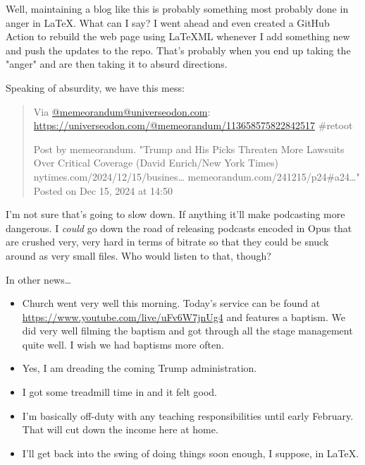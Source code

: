 Well, maintaining a blog like this is probably something most probably done in anger in \LaTeX.  What can I say?  I went ahead and even created a GitHub Action to rebuild the web page using LaTeXML whenever I add something new and push the updates to the repo.  That's probably when you end up taking the "anger" and are then taking it to absurd directions.

Speaking of absurdity, we have this mess:

\begin{quote}
    Via \href{https://universeodon.com/@memorandum}{@memeorandum@universeodon.com}: \url{https://universeodon.com/@memeorandum/113658575822842517} \#retoot

    Post by memeorandum. "Trump and His Picks Threaten More Lawsuits Over Critical Coverage (David Enrich/New York Times) nytimes.com/2024/12/15/busines… memeorandum.com/241215/p24\#a24…" Posted on Dec 15, 2024 at 14:50

\end{quote}

I'm not sure that's going to slow down.  If anything it'll make podcasting more dangerous.  I \emph{could} go down the road of releasing podcasts encoded in Opus that are crushed very, very hard in terms of bitrate so that they could be snuck around as very small files.  Who would listen to that, though?

In other news\ldots 

\begin{itemize}
\item Church went very well this morning.  Today's service can be found at \url{https://www.youtube.com/live/uFv6W7jnUg4} and features a baptism.  We did very well filming the baptism and got through all the stage management quite well.  I wish we had baptisms more often.
\item Yes, I am dreading the coming Trump administration.
\item I got some treadmill time in and it felt good.
\item I'm basically off-duty with any teaching responsibilities until early February.  That will cut down the income here at home.
\item I'll get back into the swing of doing things soon enough, I suppose, in \LaTeX. 
\end{itemize}

